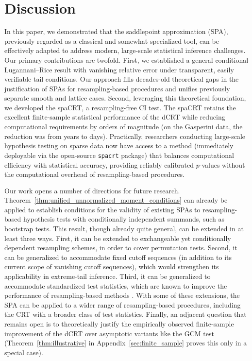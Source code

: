 \documentclass[12pt]{article}
\theoremstyle{definition}
\begin{document}
  

  
  \section{Discussion} \label{sec:discussion}

  In this paper, we demonstrated that the saddlepoint approximation (SPA), previously regarded as a classical and somewhat specialized tool, can be effectively adapted to address modern, large-scale statistical inference challenges. Our primary contributions are twofold. First, we established a general conditional Lugannani–Rice result with vanishing relative error under transparent, easily verifiable tail conditions. Our approach fills decades-old theoretical gaps in the justification of SPAs for resampling-based procedures and unifies previously separate smooth and lattice cases. Second, leveraging this theoretical foundation, we developed the spaCRT, a resampling-free CI test. The spaCRT retains the excellent finite-sample statistical performance of the dCRT while reducing computational requirements by orders of magnitude (on the Gasperini data, the reduction was from years to days). Practically, researchers conducting large-scale hypothesis testing on sparse data now have access to a method (immediately deployable via the open-source \verb|spacrt| package) that balances computational efficiency with statistical accuracy, providing reliably calibrated $p$-values without the computational overhead of resampling-based procedures.

  Our work opens a number of directions for future research. Theorem~\ref{thm:unified_unnormalized_moment_conditions} can already be applied to establish conditions for the validity of existing SPAs to resampling-based hypothesis tests with conditionally independent summands, such as bootstrap tests. This result, though already quite general, can be extended in at least three ways. First, it can be extended to exchangeable yet conditionally dependent resampling schemes, in order to cover permutation tests. Second, it can be generalized to accommodate fixed cutoff sequences (in addition to its current scope of vanishing cutoff sequences), which would strengthen its applicability in extreme-tail inference. Third, it can be generalized to accommodate standardized test statistics, which are known to improve the performance of resampling-based methods \citep{Hall2010a, Chung2013, Barry2025}. With some of these extensions, the SPA can be applied to a wider range of resampling-based procedures, including the CRT with a broader class of test statistics. Finally, an adjacent question that remains open is to theoretically justify the empirically observed finite-sample improvement of the dCRT over asymptotic variants like the GCM test (Theorem~\ref{thm:illustrative} in Appendix~\ref{sec:finite_sample} proves this only in a special case).
\end{document}
